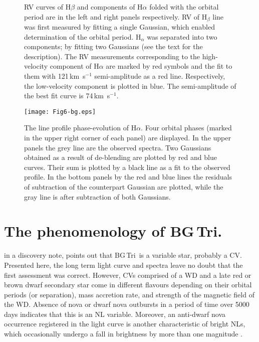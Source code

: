 \documentclass[fleqn,usenatbib]{mnras}
\def\bg{BG\,Tri}
\begin{document}
\begin{figure*}
\setlength{\unitlength}{1mm}
\caption{
 RV curves of H$\beta$ and components of H$\alpha$ folded with the orbital period are in the left and right panels respectively. RV of
 H$_\beta$ line was first measured by fitting a single Gaussian, which enabled determination of the orbital period.  H$_\alpha$ was separated
 into two components; by fitting two Gaussians (see the text for the description). The RV measurements corresponding to the high-velocity
 component of H$\alpha$ are marked by red symbols and the fit to them  with 121\,km~s$^{-1}$ semi-amplitude as a red line. Respectively, 
 the low-velocity component is plotted in blue. The semi-amplitude of the best fit curve is 74\,km~s$^{-1}$.  }
\label{fig:rvcurves}
\end{figure*}

\begin{figure}
\texttt{[image: Fig6-bg.eps]}
\caption{
 The line profile phase-evolution of H$\alpha$. Four orbital phases (marked in the upper right corner of each panel) are displayed. In the
 upper panels the grey line are the observed spectra. Two Gaussians obtained as a result of de-blending are plotted by red and blue curves.
 Their sum is plotted by a black line as a fit to the observed profile. In the bottom panels by the red and blue lines the residuals of
 subtraction of the counterpart Gaussian are plotted, while the gray line is after subtraction of both Gaussians.}
\label{fig:profiles}
\end{figure}





\section{The phenomenology of \bg.}
\label{subsec:sed}

\citet{2008PZP.....8....4K} in a discovery note, points out that \bg\ is a variable star, probably a CV. Presented here, the long term light curve and spectra leave no doubt that the first assessment was correct. However, CVs comprised of a WD and a late red or brown dwarf secondary star come in different flavours depending on their orbital periods (or separation), mass accretion rate,  and strength of the magnetic field of 
the WD. Absence of nova or dwarf nova outbursts in a period of time over 5000\,days indicates that this is an NL variable. Moreover, an
anti-dwarf nova occurrence registered in the light curve is another characteristic of bright NLs, which occasionally undergo a fall in
brightness by more than one magnitude \citep{1995CAS....28.....W}. 
\end{document}
